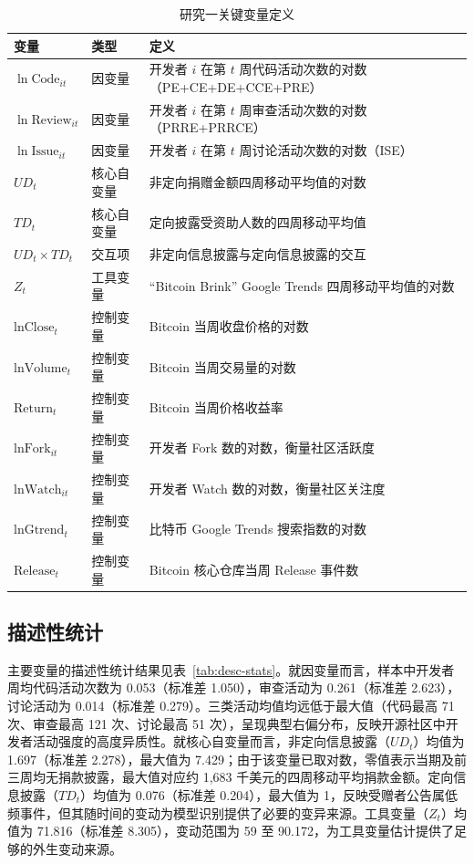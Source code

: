 \begin{table}[htbp]
    \centering
    \caption{研究一关键变量定义}
    \label{tab:variables-1}
    \begin{tabularx}{\textwidth}{p{4.2cm}p{1.8cm}X}
        \toprule
        变量 & 类型 & 定义 \\
        \midrule
        $\ln\text{Code}_{it}$ & 因变量 & 开发者 $i$ 在第 $t$ 周代码活动次数的对数（PE+CE+DE+CCE+PRE） \\
        $\ln\text{Review}_{it}$ & 因变量 & 开发者 $i$ 在第 $t$ 周审查活动次数的对数（PRRE+PRRCE） \\
        $\ln\text{Issue}_{it}$ & 因变量 & 开发者 $i$ 在第 $t$ 周讨论活动次数的对数（ISE） \\
        $UD_t$ & 核心自变量 & 非定向捐赠金额四周移动平均值的对数 \\
        $TD_t$ & 核心自变量 & 定向披露受资助人数的四周移动平均值 \\
        $UD_t \times TD_t$ & 交互项 & 非定向信息披露与定向信息披露的交互 \\
        $Z_t$ & 工具变量 & “Bitcoin Brink” Google Trends 四周移动平均值的对数 \\
        $\text{lnClose}_t$ & 控制变量 & Bitcoin 当周收盘价格的对数 \\
        $\text{lnVolume}_t$ & 控制变量 & Bitcoin 当周交易量的对数 \\
        $\text{Return}_t$ & 控制变量 & Bitcoin 当周价格收益率 \\
        $\text{lnFork}_{it}$ & 控制变量 & 开发者 Fork 数的对数，衡量社区活跃度 \\
        $\text{lnWatch}_{it}$ & 控制变量 & 开发者 Watch 数的对数，衡量社区关注度 \\
        $\text{lnGtrend}_t$ & 控制变量 & 比特币 Google Trends 搜索指数的对数 \\
        $\text{Release}_t$ & 控制变量 & Bitcoin 核心仓库当周 Release 事件数 \\
        \bottomrule
    \end{tabularx}
\end{table}

\subsection{描述性统计}

主要变量的描述性统计结果见表~\ref{tab:desc-stats}。就因变量而言，样本中开发者周均代码活动次数为 0.053（标准差 1.050），审查活动为 0.261（标准差 2.623），讨论活动为 0.014（标准差 0.279）。三类活动均值均远低于最大值（代码最高 71 次、审查最高 121 次、讨论最高 51 次），呈现典型右偏分布，反映开源社区中开发者活动强度的高度异质性。就核心自变量而言，非定向信息披露（$UD_t$）均值为 1.697（标准差 2.278），最大值为 7.429；由于该变量已取对数，零值表示当期及前三周均无捐款披露，最大值对应约 1,683 千美元的四周移动平均捐款金额。定向信息披露（$TD_t$）均值为 0.076（标准差 0.204），最大值为 1，反映受赠者公告属低频事件，但其随时间的变动为模型识别提供了必要的变异来源。工具变量（$Z_t$）均值为 71.816（标准差 8.305），变动范围为 59 至 90.172，为工具变量估计提供了足够的外生变动来源。

